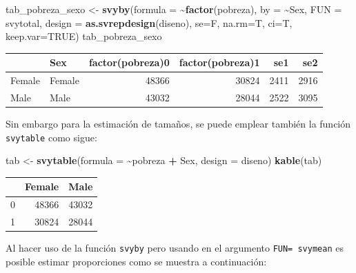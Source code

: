 \documentclass[
  spanish,
  12pt,
]{book}
\newenvironment{Shaded}{\begin{snugshade}}{\end{snugshade}}
\newcommand{\AttributeTok}[1]{\textcolor[rgb]{0.13,0.29,0.53}{#1}}
\newcommand{\ConstantTok}[1]{\textcolor[rgb]{0.56,0.35,0.01}{#1}}
\newcommand{\FunctionTok}[1]{\textcolor[rgb]{0.13,0.29,0.53}{\textbf{#1}}}
\newcommand{\NormalTok}[1]{#1}
\newcommand{\OtherTok}[1]{\textcolor[rgb]{0.56,0.35,0.01}{#1}}
\newcommand{\SpecialCharTok}[1]{\textcolor[rgb]{0.81,0.36,0.00}{\textbf{#1}}}
\begin{document}
\begin{Shaded}
\begin{Highlighting}[]
\NormalTok{tab\_pobreza\_sexo }\OtherTok{\textless{}{-}} \FunctionTok{svyby}\NormalTok{(}\AttributeTok{formula =} \SpecialCharTok{\textasciitilde{}}\FunctionTok{factor}\NormalTok{(pobreza), }
                          \AttributeTok{by =} \SpecialCharTok{\textasciitilde{}}\NormalTok{Sex,}
                          \AttributeTok{FUN =}\NormalTok{ svytotal, }
                          \AttributeTok{design =} \FunctionTok{as.svrepdesign}\NormalTok{(diseno), }
                          \AttributeTok{se=}\NormalTok{F, }\AttributeTok{na.rm=}\NormalTok{T, }\AttributeTok{ci=}\NormalTok{T, }\AttributeTok{keep.var=}\ConstantTok{TRUE}\NormalTok{)}
\NormalTok{tab\_pobreza\_sexo}
\end{Highlighting}
\end{Shaded}

\begin{tabular}{l|l|r|r|r|r}
\hline
  & Sex & factor(pobreza)0 & factor(pobreza)1 & se1 & se2\\
\hline
Female & Female & 48366 & 30824 & 2411 & 2916\\
\hline
Male & Male & 43032 & 28044 & 2522 & 3095\\
\hline
\end{tabular}

Sin embargo para la estimación de tamaños, se puede emplear también la función \texttt{svytable} como sigue:

\begin{Shaded}
\begin{Highlighting}[]
\NormalTok{tab }\OtherTok{\textless{}{-}} \FunctionTok{svytable}\NormalTok{(}\AttributeTok{formula =} \SpecialCharTok{\textasciitilde{}}\NormalTok{pobreza }\SpecialCharTok{+}\NormalTok{ Sex, }\AttributeTok{design =}\NormalTok{ diseno)}
\FunctionTok{kable}\NormalTok{(tab)}
\end{Highlighting}
\end{Shaded}

\begin{tabular}{l|r|r}
\hline
  & Female & Male\\
\hline
0 & 48366 & 43032\\
\hline
1 & 30824 & 28044\\
\hline
\end{tabular}

Al hacer uso de la función \texttt{svyby} pero usando en el argumento \texttt{FUN=\ svymean} es posible estimar proporciones como se muestra a continuación:
\end{document}
